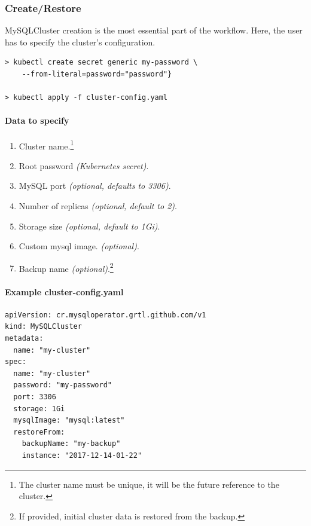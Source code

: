 \subsubsection*{Create/Restore}

MySQLCluster creation is the most essential part of the
workflow. Here, the user has to specify the cluster's configuration.

\begin{lstlisting}
> kubectl create secret generic my-password \
	--from-literal=password="password"}

> kubectl apply -f cluster-config.yaml
\end{lstlisting}

\paragraph{Data to specify}
\begin{enumerate}
	\item Cluster name.\footnote{The cluster name must be unique, it will be the future reference
	to the cluster.}
	\item Root password \textit{(Kubernetes secret)}.
	\item MySQL port \textit{(optional, defaults to 3306)}.
	\item Number of replicas \textit{(optional, default to 2)}.
	\item Storage size \textit{(optional, default to 1Gi)}.
	\item Custom mysql image. \textit{(optional)}.
	\item Backup name \textit{(optional)}.\footnote{If provided, initial cluster data is restored
	from the backup.}
\end{enumerate}

\paragraph{Example \textbf{cluster-config.yaml}}
\begin{lstlisting}[caption=cluster-config.yaml,captionpos=b]
apiVersion: cr.mysqloperator.grtl.github.com/v1
kind: MySQLCluster
metadata:
  name: "my-cluster"
spec:
  name: "my-cluster"
  password: "my-password"
  port: 3306
  storage: 1Gi
  mysqlImage: "mysql:latest"
  restoreFrom:
	backupName: "my-backup"
	instance: "2017-12-14-01-22"
\end{lstlisting}

